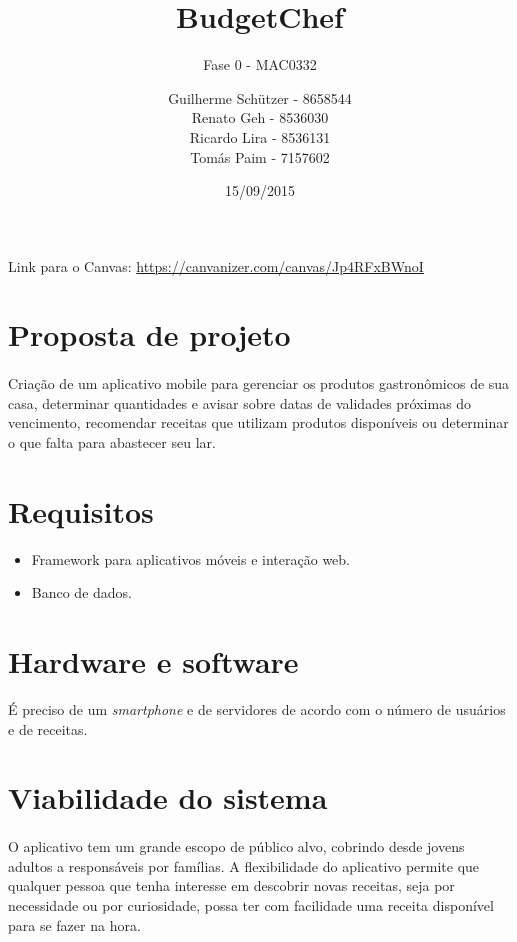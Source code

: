 \documentclass[a4paper]{article}
\title{\textbf{BudgetChef}}
\subtitle{Fase 0 - MAC0332}
\author{
	Guilherme Schützer - 8658544\\
	Renato Geh - 8536030\\
	Ricardo Lira - 8536131\\
	Tomás Paim - 7157602\\
}
\date{15/09/2015}
\begin{document}
\maketitle

Link para o Canvas: \url{https://canvanizer.com/canvas/Jp4RFxBWnoI}

\section{Proposta de projeto}

\paragraph{} Criação de um aplicativo mobile para gerenciar os produtos gastronômicos de sua casa, determinar quantidades e avisar sobre datas de validades próximas do vencimento, recomendar receitas que utilizam produtos disponíveis ou determinar o que falta para abastecer seu lar.

\section{Requisitos}

\begin{itemize}

\item Framework para aplicativos móveis e interação web.
\item Banco de dados.

\end{itemize}

\section{Hardware e software}

É preciso de um \emph{smartphone} e de servidores de acordo com o número de usuários e de receitas.

\section{Viabilidade do sistema}

\paragraph{} O aplicativo tem um grande escopo de público alvo, cobrindo desde jovens adultos a responsáveis por famílias. A flexibilidade do aplicativo permite que qualquer pessoa que tenha interesse em descobrir novas receitas, seja por necessidade ou por curiosidade, possa ter com facilidade uma receita disponível para se fazer na hora.
\end{document}
